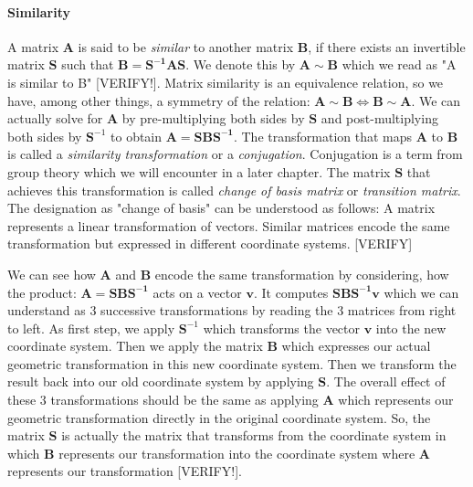 \paragraph{Similarity}
A matrix $\mathbf{A}$ is said to be \emph{similar} to another matrix $\mathbf{B}$, if there exists an invertible matrix $\mathbf{S}$ such that $\mathbf{B} = \mathbf{S^{-1} A S}$. We denote this by $\mathbf{A} \sim \mathbf{B}$ which we read as "A is similar to B" [VERIFY!]. Matrix similarity is an equivalence relation, so we have, among other things, a symmetry of the relation: $\mathbf{A} \sim \mathbf{B} \Leftrightarrow \mathbf{B} \sim \mathbf{A}$. We can actually solve for $\mathbf{A}$ by pre-multiplying both sides by $\mathbf{S}$ and post-multiplying both sides by $\mathbf{S}^{-1}$ to obtain $\mathbf{A} = \mathbf{S B S^{-1}}$. The transformation that maps $\mathbf{A}$ to $\mathbf{B}$ is called a \emph{similarity transformation} or a \emph{conjugation}. Conjugation is a term from group theory which we will encounter in a later chapter. The matrix $\mathbf{S}$ that achieves this transformation is called \emph{change of basis matrix} or \emph{transition matrix}. The designation as "change of basis" can be understood as follows: A matrix represents a linear transformation of vectors. Similar matrices encode the same transformation but expressed in different coordinate systems. [VERIFY]

\medskip
We can see how $\mathbf{A}$ and $\mathbf{B}$ encode the same transformation by considering, how the product: $\mathbf{A} = \mathbf{S B S^{-1}}$ acts on a vector $\mathbf{v}$. It computes $\mathbf{S B S^{-1} v}$ which we can understand as 3 successive transformations by reading the 3 matrices from right to left. As first step, we apply $\mathbf{S}^{-1}$ which transforms the vector $\mathbf{v}$ into the new coordinate system. Then we apply the matrix $\mathbf{B}$ which expresses our actual geometric transformation in this new coordinate system. Then we transform the result back into our old coordinate system by applying $\mathbf{S}$. The overall effect of these 3 transformations should be the same as applying $\mathbf{A}$ which represents our geometric transformation directly in the original coordinate system. So, the matrix $\mathbf{S}$ is actually the matrix that transforms from the coordinate system in which $\mathbf{B}$ represents our transformation into the coordinate system where $\mathbf{A}$ represents our transformation [VERIFY!].





